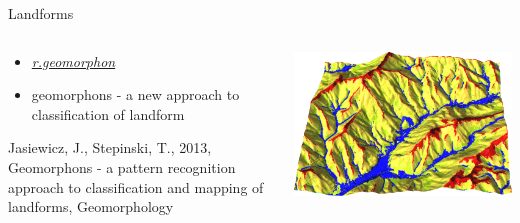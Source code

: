 \documentclass[xcolor={dvipsnames,usenames},beamer,aspectratio=43]{beamer}
\newcommand{\amodule}[1]{\href{http://grass.osgeo.org/grass70/manuals/addons/#1.html}{\emph{#1}}}
\begin{document}
\begin{frame}{Landforms}

\begin{columns}
\begin{column}{0.3\textwidth}

\begin{itemize}
  \item \amodule{r.geomorphon}
  \item geomorphons - a new approach to classification of landform\footnotemark[1]
\end{itemize}

\footnotesize
\footnotemark[1]
Jasiewicz, J., Stepinski, T., 2013,
Geomorphons - a pattern recognition approach to classification and mapping of landforms, Geomorphology%

\end{column}
\begin{column}{0.68\textwidth}

\begin{center}
  \includegraphics[width=\textwidth]{vis/geomorphon_3d}
\end{center}

\end{column}
\end{columns}

\end{frame}
\end{document}
